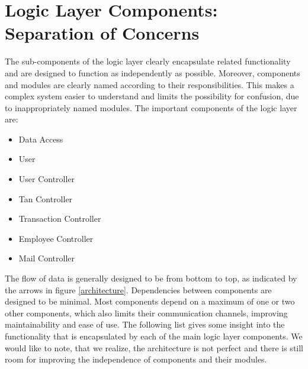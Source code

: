 \section{Logic Layer Components: Separation of Concerns}
The sub-components of the logic layer clearly encapsulate related functionality and are designed to function as independently as possible. Moreover, components and modules are clearly named according to their responsibilities. This makes a complex system easier to understand and limits the possibility for confusion, due to inappropriately named modules. The important components of the logic layer are:
\begin{itemize}

  \item Data Access
  \item User
  \item User Controller
  \item Tan Controller
  \item Transaction Controller
  \item Employee Controller
  \item Mail Controller

\end{itemize}
The flow of data is generally designed to be from bottom to top, as indicated by the arrows in figure \ref{architecture}. Dependencies between components are designed to be minimal. Most components depend on a maximum of one or two other components, which also limits their communication channels, improving maintainability and ease of use. The following list gives some insight into the functionality that is encapsulated by each of the main logic layer components. We would like to note, that we realize, the architecture is not perfect and there is still room for improving the independence of components and their modules.
